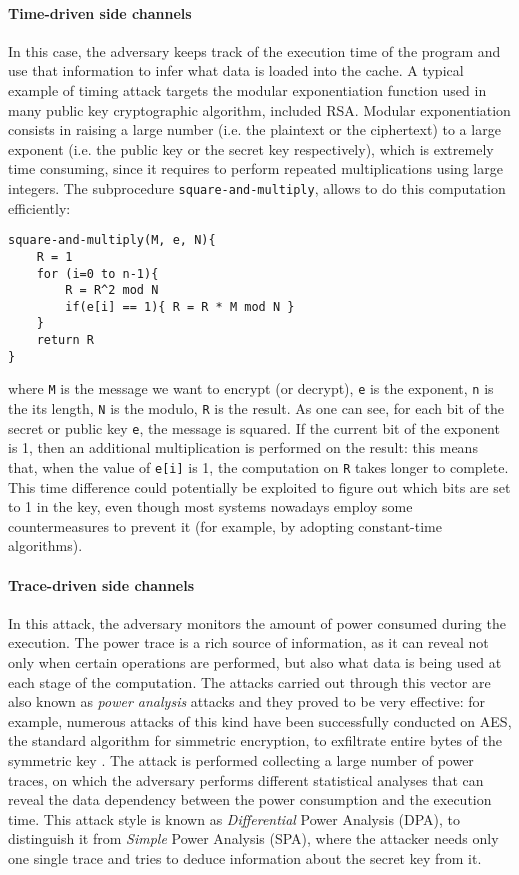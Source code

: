 \documentclass[12pt,a4paper]{book}
\theoremstyle{definition}
\begin{document}
	\paragraph{Time-driven side channels} In this case, the adversary keeps track of the execution time of the program and use that information to infer what data is loaded into the cache. 
	A typical example of timing attack targets the modular exponentiation function used in many public key cryptographic algorithm, included RSA. Modular exponentiation consists in raising a large number (i.e. the plaintext or the ciphertext) to a large exponent (i.e. the public key or the secret key respectively), which is extremely time consuming, since it requires to perform repeated multiplications using large integers. The subprocedure \texttt{square-and-multiply}, allows to do this computation efficiently:
	\begin{lstlisting}
square-and-multiply(M, e, N){
	R = 1
	for (i=0 to n-1){
		R = R^2 mod N
		if(e[i] == 1){ R = R * M mod N }
	}	
	return R
}
	\end{lstlisting}
	where \texttt{M} is the message we want to encrypt (or decrypt), \texttt{e} is the exponent, \texttt{n} is the its length, \texttt{N} is the modulo, \texttt{R} is the result. As one can see, for each bit of the secret or public key \texttt{e}, the message is squared. If the current bit of the exponent is 1, then an additional multiplication is performed on the result: this means that, when the value of \texttt{e[i]} is 1, the computation on \texttt{R} takes longer to complete. This time difference could potentially be exploited to figure out which bits are set to 1 in the key, even though most systems nowadays employ some countermeasures to prevent it (for example, by adopting constant-time algorithms).
	\paragraph{Trace-driven side channels} In this attack, the adversary monitors the amount of power consumed during the execution. The power trace is a rich source of information, as it can reveal not only when certain operations are performed, but also what data is being used at each stage of the computation. The attacks carried out through this vector are also known as \textit{power analysis} attacks and they proved to be very effective: for example, numerous attacks of this kind have been successfully conducted on AES, the standard algorithm for simmetric encryption, to exfiltrate entire bytes of the symmetric key \cite{Buchanan2017} \cite{Mangard2003} \cite{Mangard2010} \cite{Oswald2004}. The attack is performed collecting a large number of power traces, on which the adversary performs different statistical analyses that can reveal the data dependency between the power consumption and the execution time. This attack style is known as \textit{Differential} Power Analysis (DPA), to distinguish it from \textit{Simple} Power Analysis (SPA), where the attacker needs only one single trace and tries to deduce information about the secret key from it.
\end{document}
